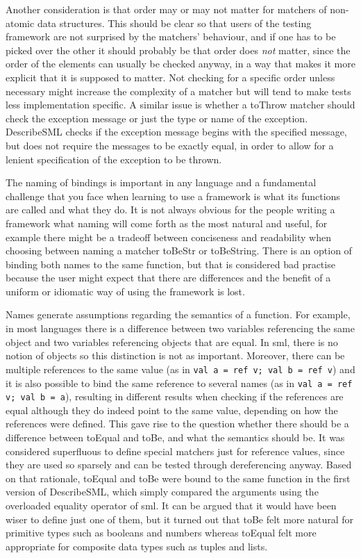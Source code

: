 \documentclass[11pt]{article}
\begin{document}
Another consideration is that order may or may not matter for matchers of non-atomic data structures. This should be clear so that users of the testing framework are not surprised by the matchers' behaviour, and if one has to be picked over the other it should probably be that order does \emph{not} matter, since the order of the elements can usually be checked anyway, in a way that makes it more explicit that it is supposed to matter. Not checking for a specific order unless necessary might increase the complexity of a matcher but will tend to make tests less implementation specific. A similar issue is whether a toThrow matcher should check the exception message or just the type or name of the exception. DescribeSML checks if the exception message begins with the specified message, but does not require the messages to be exactly equal, in order to allow for a lenient specification of the exception to be thrown.

The naming of bindings is important in any language and a fundamental challenge that you face when learning to use a framework is what its functions are called and what they do. It is not always obvious for the people writing a framework what naming will come forth as the most natural and useful, for example there might be a tradeoff between conciseness and readability when choosing between naming a matcher toBeStr or toBeString. There is an option of binding both names to the same function, but that is considered bad practise because the user might expect that there are differences and the benefit of a uniform or idiomatic way of using the framework is lost.

Names generate assumptions regarding the semantics of a function. For example, in most languages there is a difference between two variables referencing the same object and two variables referencing objects that are equal. In \gls{sml}, there is no notion of objects so this distinction is not as important. Moreover, there can be multiple references to the same value (as in \texttt{val a = ref v; val b = ref v}) and it is also possible to bind the same reference to several names (as in \texttt{val a = ref v; val b = a}), resulting in different results when checking if the references are equal although they do indeed point to the same value, depending on how the references were defined. This gave rise to the question whether there should be a difference between toEqual and toBe, and what the semantics should be. It was considered superfluous to define special matchers just for reference values, since they are used so sparsely and can be tested through dereferencing anyway. Based on that rationale, toEqual and toBe were bound to the same function in the first version of DescribeSML, which simply compared the arguments using the overloaded equality operator of \gls{sml}. It can be argued that it would have been wiser to define just one of them, but it turned out that toBe felt more natural for primitive types such as booleans and numbers whereas toEqual felt more appropriate for composite data types such as tuples and lists.
\end{document}
